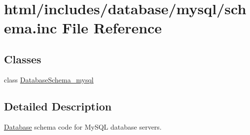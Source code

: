 \hypertarget{mysql_2schema_8inc}{
\section{html/includes/database/mysql/schema.inc File Reference}
\label{mysql_2schema_8inc}
}
\subsection*{Classes}
\begin{DoxyCompactItemize}
\item 
class \hyperlink{classDatabaseSchema__mysql}{DatabaseSchema\_\-mysql}
\end{DoxyCompactItemize}


\subsection{Detailed Description}
\hyperlink{classDatabase}{Database} schema code for MySQL database servers. 
